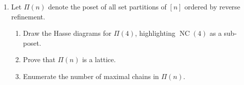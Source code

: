 \documentclass[11pt]{article}%
\theoremstyle{definition}
\DeclareMathOperator{\NC}{NC}
\begin{document}
\begin{enumerate}
\item Let $\Pi(n)$ denote the poset of all set partitions of $[n]$ ordered by reverse refinement.
\begin{enumerate}
\item Draw the Hasse diagrams for $\Pi(4)$, highlighting $\NC(4)$ as a sub-poset.
\item Prove that $\Pi(n)$ is a lattice.
\item Enumerate the number of maximal chains in $\Pi(n)$.
\end{enumerate}

\end{enumerate}
\end{document}
